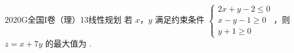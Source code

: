 
\begin{problem}{2020}{G}{全国I卷（理）}{13}{线性规划}
若 $ x $，$ y $ 满足约束条件 $ \begin{cases} 2x + y - 2 \leqslant 0 \\ x - y - 1 \geqslant 0 \\ y + 1 \geqslant 0 \end{cases} $，则 $ z = x + 7y $ 的最大值为 \underline{\hspace{4em}}.
\end{problem}

\begin{answer}

\end{answer}

\begin{solutions}

\end{solutions}